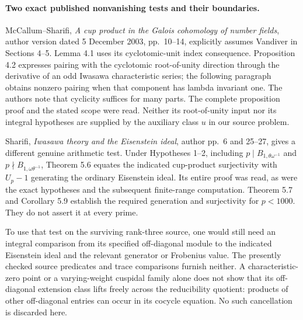 \paragraph{Two exact published nonvanishing tests and their boundaries.}
McCallum--Sharifi, \emph{A cup product in the Galois
cohomology of number fields}, author version dated
5 December 2003, pp.~10--14, explicitly assumes
Vandiver in Sections 4--5.  Lemma 4.1 uses its
cyclotomic-unit index consequence.  Proposition 4.2
expresses pairing with the cyclotomic root-of-unity
direction through the derivative of an odd Iwasawa
characteristic series; the following paragraph obtains
nonzero pairing when that component has lambda
invariant one.  The authors note that cyclicity suffices
for many parts.  The complete proposition proof and
the stated scope were read.  Neither its root-of-unity
input nor its integral hypotheses are supplied by
the auxiliary class \(u\) in our source problem.

Sharifi, \emph{Iwasawa theory and the Eisenstein ideal},
author pp.~6 and 25--27, gives a different genuine
arithmetic test.  Under Hypotheses 1--2, including
\(p\mid B_{1,\theta\omega^{-1}}\) and
\(p\nmid B_{1,\omega\theta^{-1}}\), Theorem 5.6
equates the indicated cup-product surjectivity with
\(U_p-1\) generating the ordinary Eisenstein ideal.
Its entire proof was read, as were the exact
hypotheses and the subsequent finite-range computation.
Theorem 5.7 and Corollary 5.9 establish the required
generation and surjectivity for \(p<1000\).
They do not assert it at every prime.

To use that test on the surviving rank-three source,
one would still need an integral comparison from its
specified off-diagonal module to the indicated
Eisenstein ideal and the relevant generator or
Frobenius value.  The presently checked source
predicates and trace comparisons furnish neither.
A characteristic-zero point or a varying-weight
cuspidal family alone does not show that its
off-diagonal extension class lifts freely across
the reducibility quotient: products of other
off-diagonal entries can occur in its cocycle
equation.  No such cancellation is discarded here.

